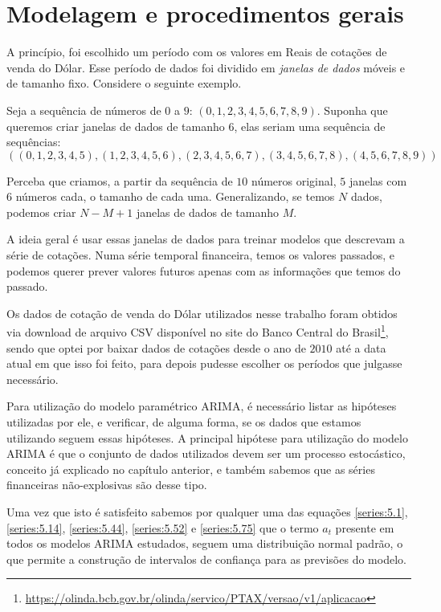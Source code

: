 \section{Modelagem e procedimentos gerais}

A princípio, foi escolhido um período com os valores em Reais de cotações de venda do Dólar. Esse período de dados foi dividido em \emph{janelas de dados} móveis e de tamanho fixo. Considere o seguinte exemplo. 

Seja a sequência de números de $0$ a $9$: $(0,1,2,3,4,5,6,7,8,9)$. Suponha que queremos criar janelas de dados de tamanho $6$, elas seriam uma sequência de sequências:
\[ ((0,1,2,3,4,5),(1,2,3,4,5,6),(2,3,4,5,6,7),(3,4,5,6,7,8),(4,5,6,7,8,9)) \]

Perceba que criamos, a partir da sequência de $10$ números original, $5$ janelas com $6$ números cada, o tamanho de cada uma. Generalizando, se temos $N$ dados, podemos criar $N{-}M{+}1$ janelas de dados de tamanho $M$.

A ideia geral é usar essas janelas de dados para treinar modelos que descrevam a série de cotações. Numa série temporal financeira, temos os valores passados, e podemos querer prever valores futuros apenas com as informações que temos do passado.

Os dados de cotação de venda do Dólar utilizados nesse trabalho foram obtidos via download de arquivo CSV disponível no site do Banco Central do Brasil\footnote{\url{https://olinda.bcb.gov.br/olinda/servico/PTAX/versao/v1/aplicacao}}, sendo que optei por baixar dados de cotações desde o ano de $2010$ até a data atual em que isso foi feito, para depois pudesse escolher os períodos que julgasse necessário.

Para utilização do modelo paramétrico ARIMA, é necessário listar as hipóteses utilizadas por ele, e verificar, de alguma forma, se os dados que estamos utilizando seguem essas hipóteses. A principal hipótese para utilização do modelo ARIMA é que o conjunto de dados utilizados devem ser um processo estocástico, conceito já explicado no capítulo anterior, e também sabemos que as séries financeiras não-explosivas são desse tipo.

Uma vez que isto é satisfeito sabemos por qualquer uma das equações \ref{series:5.1}, \ref{series:5.14}, \ref{series:5.44}, \ref{series:5.52} e \ref{series:5.75} que o termo $a_t$ presente em todos os modelos ARIMA estudados, seguem uma distribuição normal padrão, o que permite a construção de intervalos de confiança para as previsões do modelo.

